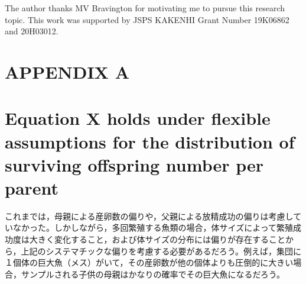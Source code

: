 \documentclass[AMA,STIX1COL]{WileyNJD-v2}
\begin{document}
The author thanks MV Bravington for motivating me to pursue this research topic. This work was supported by JSPS KAKENHI Grant Number 19K06862 and 20H03012.


\clearpage

\section*{APPENDIX A}
\setcounter{equation}{0}

\section*{Equation X holds under flexible assumptions for the distribution of surviving offspring number per parent}

\renewcommand{\theequation}{A\arabic{equation}}

これまでは，母親による産卵数の偏りや，父親による放精成功の偏りは考慮していなかった。しかしながら，多回繁殖する魚類の場合，体サイズによって繁殖成功度は大きく変化すること，および体サイズの分布には偏りが存在することから，上記のシステマチックな偏りを考慮する必要があるだろう。例えば，集団に１個体の巨大魚（メス）がいて，その産卵数が他の個体よりも圧倒的に大きい場合，サンプルされる子供の母親はかなりの確率でその巨大魚になるだろう。
\end{document}
